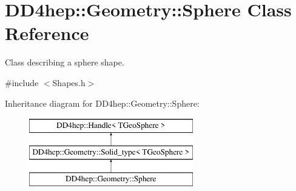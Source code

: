 \hypertarget{class_d_d4hep_1_1_geometry_1_1_sphere}{}\section{D\+D4hep\+:\+:Geometry\+:\+:Sphere Class Reference}
\label{class_d_d4hep_1_1_geometry_1_1_sphere}


Class describing a sphere shape.  




{\ttfamily \#include $<$Shapes.\+h$>$}

Inheritance diagram for D\+D4hep\+:\+:Geometry\+:\+:Sphere\+:\begin{figure}[H]
\begin{center}
\leavevmode
\includegraphics[height=3.000000cm]{class_d_d4hep_1_1_geometry_1_1_sphere}
\end{center}
\end{figure}
